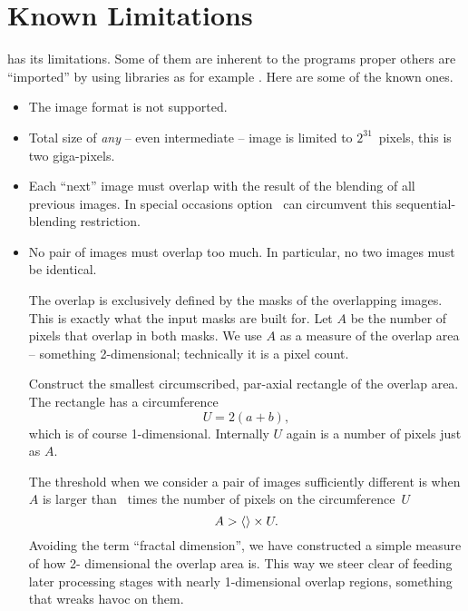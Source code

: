 

\chapter[Known Limitations]{\label{sec:known-limitations}%
  Known Limitations}

\App{} has its limitations.  Some of them are inherent to the programs proper others are
``imported'' by using libraries as for example .  Here are
some of the known ones.

\begin{itemize}
\item
  The  image format is not supported.

\item
  Total size of \emph{any} -- even intermediate -- image is limited to $2^{31}$~pixels, this is
  two giga-pixels.

\ifenblend
\item
  Each ``next'' image must overlap with the result of the blending of all previous images.  In
  special occasions option~ can circumvent this sequential-blending
  restriction.

\item
  No pair of images must overlap too much.  In particular, no two images must be identical.

  \begin{geeknote}
    The overlap is exclusively defined by the masks of the overlapping images.  This is exactly
    what the input masks are built for.  Let $A$ be the number of pixels that overlap in both
    masks.  We use $A$ as a measure of the overlap area -- something 2\hyp dimensional;
    technically it is a pixel count.

    Construct the smallest circumscribed, par-axial rectangle of the overlap area.  The
    rectangle has a circumference
    \[
    U = 2 (a + b),
    \]
    which is of course 1-dimensional.  Internally $U$ again is a number of pixels just as $A$.

    The threshold when we consider a pair of images sufficiently different is when $A$ is larger
    than ~times the number of pixels on the circumference~$U$
    \[
    A > \val{val:overlap-check-threshold} \times U.
    \]
    Avoiding the term ``fractal dimension'', we have constructed a simple measure of how 2\hyp
    dimensional the overlap area is.  This way we steer clear of feeding later processing stages
    with nearly 1\hyp dimensional overlap regions, something that wreaks havoc on them.
  \end{geeknote}


\end{itemize}
